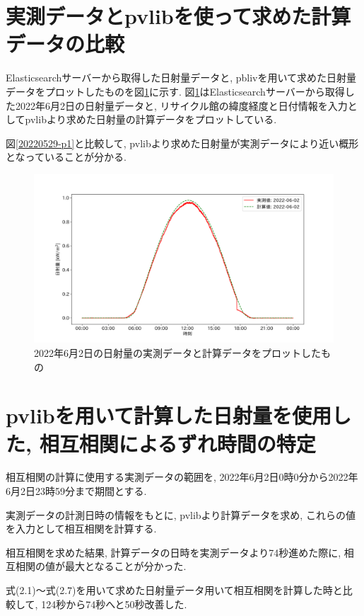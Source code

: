 \section{実測データとpvlibを使って求めた計算データの比較}
Elasticsearchサーバーから取得した日射量データと, pblivを用いて求めた日射量データをプロットしたものを図\ref{2-p1}に示す.
図\ref{2-p1}はElasticsearchサーバーから取得した2022年6月2日の日射量データと, リサイクル館の緯度経度と日付情報を入力としてpvlibより求めた日射量の計算データをプロットしている.

図\ref{20220529-p1}と比較して, pvlibより求めた日射量が実測データにより近い概形となっていることが分かる.

\begin{figure}[h]
  \begin{center}
    \includegraphics[width=160mm]{sotu/figure/2/pvlib-20220602-corr.png}
    \caption{2022年6月2日の日射量の実測データと計算データをプロットしたもの}
    \label{2-p1}
  \end{center}
\end{figure}

\section{pvlibを用いて計算した日射量を使用した, 相互相関によるずれ時間の特定}
相互相関の計算に使用する実測データの範囲を, 2022年6月2日0時0分から2022年6月2日23時59分まで期間とする.

実測データの計測日時の情報をもとに, pvlibより計算データを求め, これらの値を入力として相互相関を計算する.

相互相関を求めた結果, 計算データの日時を実測データより74秒進めた際に, 相互相関の値が最大となることが分かった.

式(2.1)～式(2.7)を用いて求めた日射量データ用いて相互相関を計算した時と比較して, 124秒から74秒へと50秒改善した.

